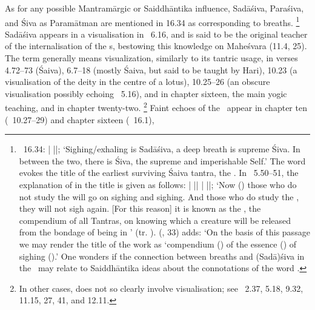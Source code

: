 As for any possible Mantramārgic or Saiddhāntika influence, Sadāśiva, Paraśiva, and Śiva as Paramātman are mentioned in 16.34 as corresponding to breaths.%
		\footnote{\VSS\ 16.34: 
						 |
		 ||;						
        `Sighing/exhaling is Sadāśiva, a deep breath is 
        supreme Śiva. In between the two, there is Śiva, the 	
        supreme and imperishable Self.'
        The word  evokes the title of 
        the earliest surviving Śaiva tantra, the \Nisv.
        In \NisvUttara\ 5.50--51, the explanation of
         in the title is given as follows:
         |
		 ||
		 |
		 ||;
        `Now () those who do not study 
        the  will go on sighing and sighing.
        And those who do study the , 
        they will not sigh again. [For this reason] it is known
         as the , the compendium of all Tantras, 
         on knowing which a creature will be released from 
         the bondage of being in ' 
         (tr. ).  
         \citeauthor{KafleNisvasaBook} 	
         (\citeyear{KafleNisvasaBook}, {33}) adds:
         `On the basis of this passage we may render 
         the title of the work as `compendium () 	
         of the essence () of sighing ().'
		   One wonders if the connection between breaths
		   and (Sadā)śiva in the \VSS\ may relate to 
		   Saiddhāntika ideas about the connotations
		   of the word .}
Sadāśiva appears in a visualisation in \VSS\ 6.16, and is said to be the original teacher of the internalisation of the s, bestowing this knowledge on Maheśvara (11.4, 25).
The term  generally means visualization, similarly to its tantric usage, in verses 4.72--73 (Śaiva), 6.7--18 (mostly Śaiva, but said to be taught by Hari), 
10.23 (a visualisation of the deity in the centre of a lotus), 
10.25--26 (an obscure visualisation possibly echoing \NisvUttara\ 5.16), and in chapter sixteen, the main yogic teaching, and in chapter twenty-two.%
		\footnote{In other cases,  does 
		not so clearly involve visualisation; see \VSS\       
        2.37, 5.18, 9.32, 11.15, 27, 41, and 12.11.}
Faint echoes of the \NisvK\ appear in chapter ten (\VSS\ 10.27--29) and chapter sixteen (\VSS\ 16.1), 

